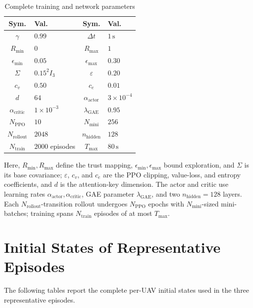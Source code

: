 \documentclass[unbranded]{cja}
\begin{document}
\begin{table}[!htbp]
\centering
\small
\setlength{\tabcolsep}{2.5pt}
\renewcommand{\arraystretch}{1.05}
\caption{Complete training and network parameters}
\label{tab:training-hyperparameters}
\begin{tabularx}{\linewidth}{@{}c >{\centering\arraybackslash}X c >{\centering\arraybackslash}X@{}}
\toprule
Sym. & Val. & Sym. & Val. \\
\midrule
$\gamma$ & $0.99$ & $\Delta t$ & $1\,\mathrm{s}$ \\
$R_{\min}$ & $0$ & $R_{\max}$ & $1$ \\
$\epsilon_{\min}$ & $0.05$ & $\epsilon_{\max}$ & $0.30$ \\
$\Sigma$ & $0.15^2 I_3$ & $\varepsilon$ & $0.20$ \\
$c_v$ & $0.50$ & $c_e$ & $0.01$ \\
$d$ & $64$ & $\alpha_{\mathrm{actor}}$ & $3{\times}10^{-4}$ \\
$\alpha_{\mathrm{critic}}$ & $1{\times}10^{-3}$ & $\lambda_{\mathrm{GAE}}$ & $0.95$ \\
$N_{\mathrm{PPO}}$ & $10$ & $N_{\mathrm{mini}}$ & $256$ \\
$N_{\mathrm{rollout}}$ & $2048$ & $n_{\mathrm{hidden}}$ & $128$ \\
$N_{\mathrm{train}}$ & $2000$ episodes & $T_{\max}$ & $80\,\mathrm{s}$ \\
\bottomrule
\end{tabularx}
\end{table}

Here, $R_{\min},R_{\max}$ define the trust mapping, $\epsilon_{\min},\epsilon_{\max}$ bound exploration, and $\Sigma$ is its base covariance; $\varepsilon$, $c_v$, and $c_e$ are the PPO clipping, value-loss, and entropy coefficients, and $d$ is the attention-key dimension. The actor and critic use learning rates $\alpha_{\mathrm{actor}},\alpha_{\mathrm{critic}}$, GAE parameter $\lambda_{\mathrm{GAE}}$, and two $n_{\mathrm{hidden}}=128$ layers. Each $N_{\mathrm{rollout}}$-transition rollout undergoes $N_{\mathrm{PPO}}$ epochs with $N_{\mathrm{mini}}$-sized mini-batches; training spans $N_{\mathrm{train}}$ episodes of at most $T_{\max}$.

\section{Initial States of Representative Episodes}
\label{app:representative-initial-states}

The following tables report the complete per-UAV initial states used in the three representative episodes.
\end{document}
